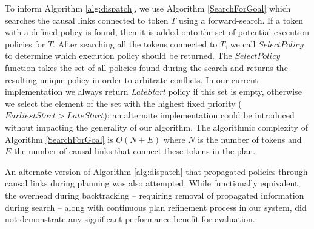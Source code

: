 
To inform Algorithm \ref{alg:dispatch}, we use Algorithm
\ref{SearchForGoal} which searches the causal links connected to token
$T$ using a forward-search.  If a token with a defined policy is
found, then it is added onto the set of potential execution policies
for $T$.  After searching all the tokens connected to $T$, we call
$SelectPolicy$ to determine which execution policy should be
returned. The $SelectPolicy$ function takes the set of all policies
found during the search and returns the resulting unique policy in
order to arbitrate conflicts. In our current implementation we always
return {\em LateStart} policy if this set is empty, otherwise we
select the element of the set with the highest fixed priority
($EarliestStart > LateStart$); an alternate implementation could be
introduced without impacting the generality of our algorithm.  The
algorithmic complexity of Algorithm \ref{SearchForGoal} is $O(N+E)$
where $N$ is the number of tokens and $E$ the number of causal links
that connect these tokens in the plan.

An alternate version of Algorithm \ref{alg:dispatch} that propagated
policies through causal links during planning was also
attempted. While functionally equivalent, the overhead during
backtracking -- requiring removal of propagated information during
search -- along with continuous plan refinement process in our system,
did not demonstrate any significant performance benefit for
evaluation.



